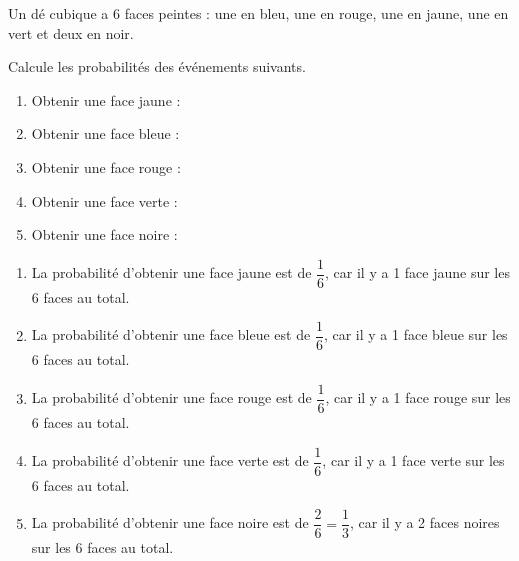 \begin{exercice*}
    Un dé cubique a 6 faces peintes : une en bleu, une en rouge, une en jaune, une en vert et deux en noir.

    Calcule les probabilités des événements suivants.

    \begin{enumerate}
        \item Obtenir une face jaune :
        \item Obtenir une face bleue :
        \item Obtenir une face rouge :
        \item Obtenir une face verte :
        \item Obtenir une face noire :
    \end{enumerate}
\end{exercice*}
\begin{corrige}
    \begin{enumerate}
        \item La probabilité d'obtenir une face jaune est de $\dfrac{1}{6}$, car il y a 1 face jaune sur les 6 faces au total.
        \item La probabilité d'obtenir une face bleue est de $\dfrac{1}{6}$, car il y a 1 face bleue sur les 6 faces au total.
        \item La probabilité d'obtenir une face rouge est de $\dfrac{1}{6}$, car il y a 1 face rouge sur les 6 faces au total.
        \item La probabilité d'obtenir une face verte est de $\dfrac{1}{6}$, car il y a 1 face verte sur les 6 faces au total.
        \item La probabilité d'obtenir une face noire est de $\dfrac{2}{6} = \dfrac{1}{3}$, car il y a 2 faces noires sur les 6 faces au total.
    \end{enumerate}
\end{corrige}

